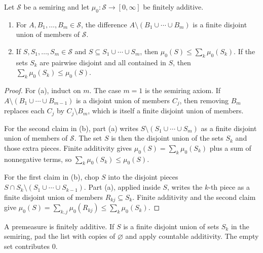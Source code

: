 \begin{lemma}\label{lem:semiring}
Let $\mathcal S$ be a semiring and let $\mu_0:\mathcal S\to[0,\infty]$ be finitely additive.
\begin{enumerate}[label=(\alph*)]
\item For $A,B_1,\ldots,B_m\in\mathcal S$, the difference $A\setminus(B_1\cup\cdots\cup B_m)$ is a finite disjoint union of members of $\mathcal S$.
\item If $S,S_1,\ldots,S_m\in\mathcal S$ and $S\subseteq S_1\cup\cdots\cup S_m$, then $\mu_0(S)\le\sum_k\mu_0(S_k)$.
If the sets $S_k$ are pairwise disjoint and all contained in $S$, then $\sum_k\mu_0(S_k)\le\mu_0(S)$.
\end{enumerate}
\end{lemma}
\begin{proof}
For (a), induct on $m$.
The case $m=1$ is the semiring axiom.
If $A\setminus(B_1\cup\cdots\cup B_{m-1})$ is a disjoint union of members $C_j$, then removing $B_m$ replaces each $C_j$ by $C_j\setminus B_m$, which is itself a finite disjoint union of members.

For the second claim in (b), part (a) writes $S\setminus(S_1\cup\cdots\cup S_m)$ as a finite disjoint union of members of $\mathcal S$.
The set $S$ is then the disjoint union of the sets $S_k$ and those extra pieces.
Finite additivity gives $\mu_0(S)=\sum_k\mu_0(S_k)$ plus a sum of nonnegative terms, so $\sum_k\mu_0(S_k)\le\mu_0(S)$.

For the first claim in (b), chop $S$ into the disjoint pieces $S\cap S_k\setminus(S_1\cup\cdots\cup S_{k-1})$.
Part (a), applied inside $S$, writes the $k$-th piece as a finite disjoint union of members $R_{kj}\subseteq S_k$.
Finite additivity and the second claim give $\mu_0(S)=\sum_{k,j}\mu_0(R_{kj})\le\sum_k\mu_0(S_k)$.
\end{proof}

A premeasure is finitely additive.
If $S$ is a finite disjoint union of sets $S_k$ in the semiring, pad the list with copies of $\varnothing$ and apply countable additivity.
The empty set contributes $0$.

